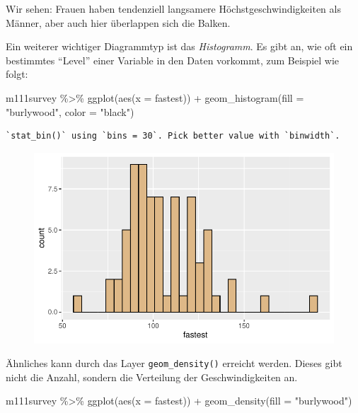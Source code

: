 \documentclass[
  letterpaper,
  DIV=11,
  numbers=noendperiod]{scrartcl}
\newenvironment{Shaded}{\begin{snugshade}}{\end{snugshade}}
\newcommand{\AttributeTok}[1]{\textcolor[rgb]{0.40,0.45,0.13}{#1}}
\newcommand{\FunctionTok}[1]{\textcolor[rgb]{0.28,0.35,0.67}{#1}}
\newcommand{\NormalTok}[1]{\textcolor[rgb]{0.00,0.23,0.31}{#1}}
\newcommand{\SpecialCharTok}[1]{\textcolor[rgb]{0.37,0.37,0.37}{#1}}
\newcommand{\StringTok}[1]{\textcolor[rgb]{0.13,0.47,0.30}{#1}}
\begin{document}
Wir sehen: Frauen haben tendenziell langsamere Höchstgeschwindigkeiten
als Männer, aber auch hier überlappen sich die Balken.

Ein weiterer wichtiger Diagrammtyp ist das \emph{Histogramm}. Es gibt
an, wie oft ein bestimmtes ``Level'' einer Variable in den Daten
vorkommt, zum Beispiel wie folgt:

\begin{Shaded}
\begin{Highlighting}[]
\NormalTok{m111survey }\SpecialCharTok{\%\textgreater{}\%} 
  \FunctionTok{ggplot}\NormalTok{(}\FunctionTok{aes}\NormalTok{(}\AttributeTok{x =}\NormalTok{ fastest)) }\SpecialCharTok{+}
  \FunctionTok{geom\_histogram}\NormalTok{(}\AttributeTok{fill =} \StringTok{"burlywood"}\NormalTok{, }\AttributeTok{color =} \StringTok{"black"}\NormalTok{)}
\end{Highlighting}
\end{Shaded}

\begin{verbatim}
`stat_bin()` using `bins = 30`. Pick better value with `binwidth`.
\end{verbatim}

\begin{figure}[H]

{\centering \includegraphics{05-visualisierung_files/figure-pdf/unnamed-chunk-7-1.pdf}

}

\end{figure}

Ähnliches kann durch das Layer \texttt{geom\_density()} erreicht werden.
Dieses gibt nicht die Anzahl, sondern die Verteilung der
Geschwindigkeiten an.

\begin{Shaded}
\begin{Highlighting}[]
\NormalTok{m111survey }\SpecialCharTok{\%\textgreater{}\%} 
  \FunctionTok{ggplot}\NormalTok{(}\FunctionTok{aes}\NormalTok{(}\AttributeTok{x =}\NormalTok{ fastest)) }\SpecialCharTok{+}
  \FunctionTok{geom\_density}\NormalTok{(}\AttributeTok{fill =} \StringTok{"burlywood"}\NormalTok{)}
\end{Highlighting}
\end{Shaded}
\end{document}
